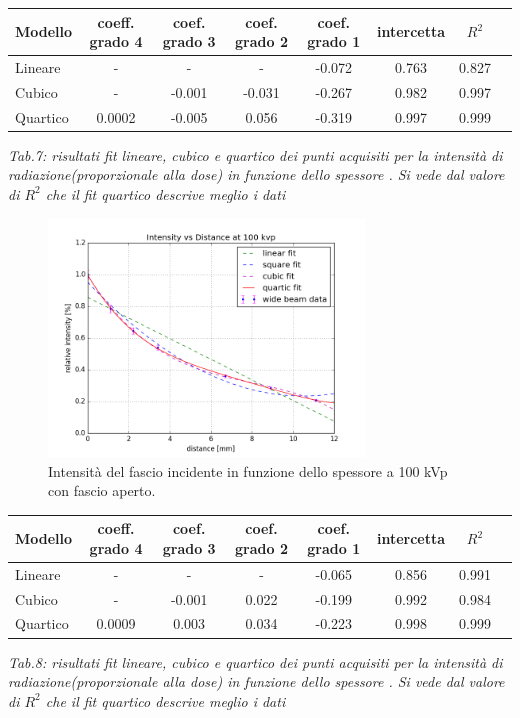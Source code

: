 \documentclass[a4paper]{article}
\begin{document}
\begin{center} 
		
		\begin{tabular}{lccccccc}
			\hline
			\hline
			\textbf{Modello}	& \textbf{coeff. grado 4}&\textbf{coef. grado 3}&\textbf{coef. grado 2}& \textbf{coef. grado 1}& \textbf{intercetta}&  \textbf{$R^{2}$} 	 \\
			\hline
			\hline
			Lineare	&-&-&-&-0.072&0.763&0.827	\\
			Cubico	&-&-0.001&-0.031&-0.267&0.982&0.997\\
			Quartico &0.0002&-0.005&0.056&-0.319&0.997&0.999\\
			
			\hline
			\hline
		\end{tabular}
		\linebreak
		\emph{Tab.7: risultati fit lineare, cubico e quartico  dei punti acquisiti per la intensità di radiazione(proporzionale alla dose) in funzione dello spessore . Si vede dal valore di $R^{2}$ che il fit quartico descrive meglio i dati} 
	\end{center} 


\begin{figure}[H]
\centering
\includegraphics[width=0.75\textwidth]{hvl100pvkwide.png}
\caption{Intensità del fascio incidente in funzione dello spessore a 100 kVp con fascio aperto.}
\end{figure}

\begin{center} 
		
		\begin{tabular}{lccccccc}
			\hline
			\hline
			\textbf{Modello}	& \textbf{coeff. grado 4}&\textbf{coef. grado 3}&\textbf{coef. grado 2}& \textbf{coef. grado 1}& \textbf{intercetta}&  \textbf{$R^{2}$} 	 \\
			\hline
			\hline
			Lineare	&-&-&-&-0.065&0.856&0.991	\\
			Cubico	&-&-0.001&0.022&-0.199&0.992&0.984\\
			Quartico &0.0009&0.003&0.034&-0.223&0.998&0.999\\
			
			\hline
			\hline
		\end{tabular}
		\linebreak
		\emph{Tab.8: risultati fit lineare, cubico e quartico  dei punti acquisiti per la intensità di radiazione(proporzionale alla dose) in funzione dello spessore . Si vede dal valore di $R^{2}$ che il fit quartico descrive meglio i dati} 
	\end{center} 
\end{document}
